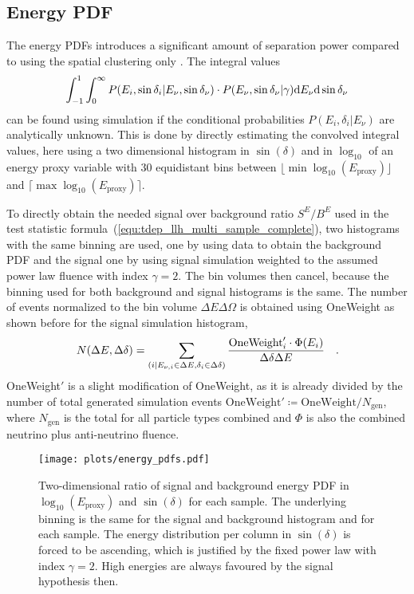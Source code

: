 \subsection*{Energy PDF}
The energy PDFs introduces a significant amount of separation power compared to using the spatial clustering only \cite{Braun:2008bg}.
The integral values
\begin{equation}
  \int_{-1}^{1}\int_0^\infty
    P(E_i,\sin{\delta_i}|E_\nu, \sin{\delta_\nu})\cdot
    P(E_\nu, \sin{\delta_\nu}|\gamma) \mathrm{d}E_\nu\mathrm{d}\sin{\delta_\nu}
\end{equation}
can be found using simulation if the conditional probabilities $P(E_i,\delta_i|E_\nu)$ are analytically unknown.
This is done by directly estimating the convolved integral values, here using a two dimensional histogram in $\sin(\delta)$ and in $\log_{10}$ of an energy proxy variable with $\num{30}$ equidistant bins between $\lfloor \min\log_{10}(E_\text{proxy}) \rfloor$ and $\lceil \max\log_{10}(E_\text{proxy}) \rceil$.

To directly obtain the needed signal over background ratio $S^E / B^E$ used in the test statistic formula~(\ref{equ:tdep_llh_multi_sample_complete}), two histograms with the same binning are used, one by using data to obtain the background PDF and the signal one by using signal simulation weighted to the assumed power law fluence with index $\gamma = 2$.
The bin volumes then cancel, because the binning used for both background and signal histograms is the same.
The number of events normalized to the bin volume $\Delta E\Delta\Omega$ is obtained using OneWeight as shown before for the signal simulation histogram,
\begin{equation}
  \label{equ:nevts_from_oneweight}
  N(\Delta E, \Delta\delta)
  = \sum_{(i|E_{\nu,i}\in\Delta E, \delta_i\in\Delta\delta)}
    \frac{\text{OneWeight}'_i \cdot \Phi(E_i)}{\Delta\delta \Delta E}
  \quad\text{.}
\end{equation}
OneWeight$'$ is a slight modification of OneWeight, as it is already divided by the number of total generated simulation events $\text{OneWeight}'\coloneqq\text{OneWeight}/N_\text{gen}$, where $N_\text{gen}$ is the total for all particle types combined and $\Phi$ is also the combined neutrino plus anti-neutrino fluence.

\begin{figure}[htbp]
  \centering
  \texttt{[image: plots/energy\_pdfs.pdf]}
  \caption[Energy PDFs for the time-dependent analysis]{
    Two-dimensional ratio of signal and background energy PDF in $\log_{10}\left(E_\text{proxy}\right)$ and $\sin(\delta)$ for each sample.
    The underlying binning is the same for the signal and background histogram and for each sample.
    The energy distribution per column in $\sin(\delta)$ is forced to be ascending, which is justified by the fixed power law with index $\gamma=2$.
    High energies are always favoured by the signal hypothesis then.
  }
  \label{fig:tdep_energy_pdfs}
\end{figure}

